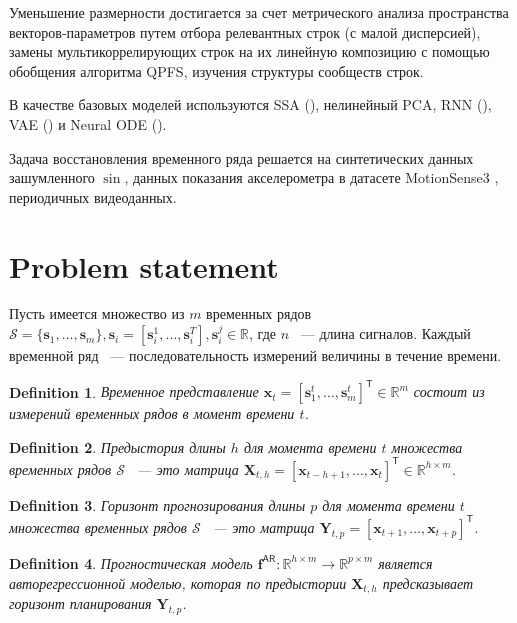 \documentclass[12pt, twoside]{article}
\newtheorem{definition}{Definition}
\begin{document}

Уменьшение размерности достигается за счет метрического анализа пространства векторов-параметров путем отбора релевантных строк (с малой дисперсией), замены мультикоррелирующих строк на их линейную композицию с помощью обобщения алгоритма QPFS, изучения структуры сообществ строк.

В качестве базовых моделей используются SSA (\citep{golyandina2001analysis}), нелинейный PCA, RNN (\citep{bronstein2021geometric}), VAE (\citep{kingma2019introduction}) и Neural ODE (\citep{chen2018neural}).

Задача восстановления временного ряда решается на синтетических данных зашумленного $\sin$, данных показания акселерометра в датасете MotionSense3 \citep{malekzadeh2018protecting}, периодичных видеоданных. 

\section{Problem statement}
Пусть имеется множество из $m$ временных рядов $\mathcal{S}=\{\mathbf{s}_1, \dots, \mathbf{s}_{m}\}, \mathbf{s}_i = [\mathbf{s}_i^1, \dots, \mathbf{s}_i^T], \mathbf{s}_i^j \in \mathbb{R}$, где $n$ ~--- длина сигналов. Каждый временной ряд ~--- последовательность измерений величины в течение времени.

\begin{definition}
Временное представление $\mathbf{x}_t = [\mathbf{s}_1^t, \dots, \mathbf{s}_m^t]^{\mathsf{T}} \in \mathbb{R}^m$ состоит из измерений временных рядов в момент времени $t$.
\end{definition}

\begin{definition}
Предыстория длины $h$ для момента времени $t$ множества временных рядов $\mathcal{S}$ ~--- это матрица $\mathbf{X}_{t,h} = [\mathbf{x}_{t-h+1}, \dots, \mathbf{x}_{t}]^{\mathsf{T}} \in \mathbb{R}^{h \times m}$.
\end{definition}

\begin{definition}
Горизонт прогнозирования длины $p$ для момента времени $t$ множества временных рядов $\mathcal{S}$ ~--- это матрица $\mathbf{Y}_{t, p} = [\mathbf{x}_{t+1}, \dots, \mathbf{x}_{t+p}]^{\mathsf{T}}$.
\end{definition}

\begin{definition}
Прогностическая модель $\mathbf{f}^{\mathsf{AR}}: \mathbb{R}^{h \times m} \to \mathbb{R}^{p \times m}$ является авторегрессионной моделью, которая по предыстории $\mathbf{X}_{t, h}$ предсказывает горизонт планирования $\mathbf{Y}_{t, p}$.
\end{definition}
\end{document}
